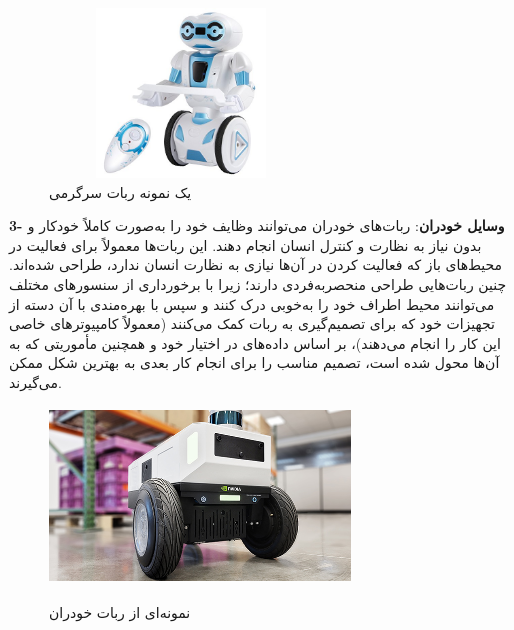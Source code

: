 \begin{itemize}
    \begin{figure}[!h]
	\vspace{0.2cm}
	\centering
	\includegraphics[height=4.5cm,width=7cm]{./Images/CH1/entertainment_robot1.jpg}
	\caption{یک نمونه ربات سرگرمی}
	\label{ربات سرگرمی}
	\end{figure}

\end{itemize}	
 
\textbf{3- وسایل خودران}:
  ربات‌های خودران می‌توانند وظایف خود را به‌صورت کاملاً خودکار و بدون نیاز به نظارت و کنترل انسان انجام دهند. این ربات‌ها معمولاً برای فعالیت در محیط‌های باز که فعالیت کردن در آن‌ها نیازی به نظارت انسان ندارد، طراحی شده‌اند. چنین ربات‌هایی طراحی منحصربه‌فردی دارند؛ زیرا با برخورداری از سنسورهای مختلف می‌توانند محیط اطراف خود را به‌خوبی درک کنند و سپس با بهره‌مندی با آن دسته از تجهیزات خود که برای تصمیم‌گیری به ربات کمک می‌کنند (معمولاً کامپیوترهای خاصی این کار را انجام می‌دهند)، بر اساس داده‌های در اختیار خود و همچنین مأموریتی که به آن‌ها محول شده است، تصمیم مناسب را برای انجام کار بعدی به بهترین شکل ممکن می‌گیرند.
    \begin{figure}[!h]
	\vspace{0.2cm}
	\centering
	\includegraphics[height=4.7cm,width=8cm]{./Images/CH1/autonomous_robot.jpg}
‌	\caption{نمونه‌ای از ربات خودران}
	\label{ربات خودران}
	\end{figure}
	
